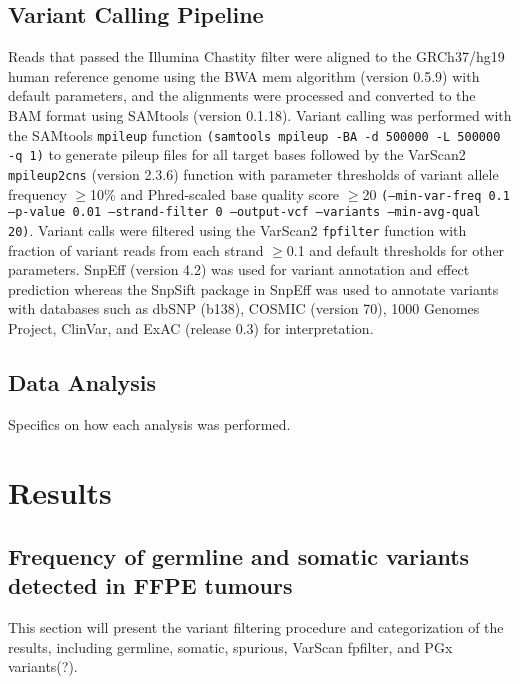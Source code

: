 \documentclass{bmcart}
\begin{document}
\subsection*{Variant Calling Pipeline}
Reads that passed the Illumina Chastity filter were aligned to the GRCh37/hg19 human reference genome using the BWA mem algorithm (version 0.5.9) with default parameters, and the alignments were processed and converted to the BAM format using SAMtools (version 0.1.18). Variant calling was performed with the SAMtools \texttt{mpileup} function \texttt{(samtools mpileup -BA -d 500000 -L 500000 -q 1)} to generate pileup files for all target bases followed by the VarScan2 \texttt{mpileup2cns} (version 2.3.6) function with parameter thresholds of variant allele frequency $\geq$10\% and Phred-scaled base quality score $\geq$20 \texttt{(--min-var-freq 0.1 --p-value 0.01 --strand-filter 0 --output-vcf --variants --min-avg-qual 20)}. Variant calls were filtered using the VarScan2 \texttt{fpfilter} function with fraction of variant reads from each strand $\geq$0.1 and default thresholds for other parameters. SnpEff (version 4.2) was used for variant annotation and effect prediction whereas the SnpSift package in SnpEff was used to annotate variants with databases such as dbSNP (b138), COSMIC (version 70), 1000 Genomes Project, ClinVar, and ExAC (release 0.3) for interpretation.

\subsection*{Data Analysis}
Specifics on how each analysis was performed.


\section*{Results}

\subsection*{Frequency of germline and somatic variants detected in FFPE tumours}
This section will present the variant filtering procedure and categorization of the results, including germline, somatic, spurious, VarScan fpfilter, and PGx variants(?).
\end{document}
